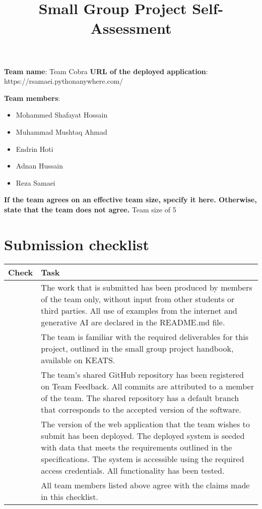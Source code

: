 \documentclass[11pt,a4paper]{article}
\begin{document}
\title{Small Group Project Self-Assessment}
\author{}
\date{}
\maketitle


\noindent\textbf{Team name}: Team Cobra
\noindent\textbf{URL of the deployed application}: https://rsamaei.pythonanywhere.com/

\noindent\textbf{Team members}:
\begin{itemize}
\setlength\itemsep{0em}
\item Mohammed Shafayat Hossain
\item Muhammad Mushtaq Ahmad
\item Endrin Hoti
\item Adnan Hussain
\item Reza Samaei
\end{itemize}

\noindent\textbf{If the team agrees on an effective team size, specify it here.  Otherwise, state that the team does not agree.} 
Team size of 5

\section*{Submission checklist}
\begin{tabular}{|p{15mm}|p{13cm}|}
\hline
Check & Task \\
\hline
& The work that is submitted has been produced by members of the team only, without input from other students or third parties.  All use of examples from the internet and generative AI are declared in the README.md file.\\
\hline
& The team is familiar with the required deliverables for this project, outlined in the small group project handbook, available on KEATS.\\
\hline
& The team's shared GitHub repository has been registered on Team Feedback.  All commits are attributed to a member of the team.  The shared repository has a default branch that corresponds to the accepted version of the software.\\
\hline
& The version of the web application that the team wishes to submit has been deployed.  The deployed system is seeded with data that meets the requirements outlined in the specifications.  The system is accessible using the required access credentials.  All functionality has been tested.\\
\hline
& All team members listed above agree with the claims made in this checklist.\\
\hline
\end{tabular}
\end{document}
